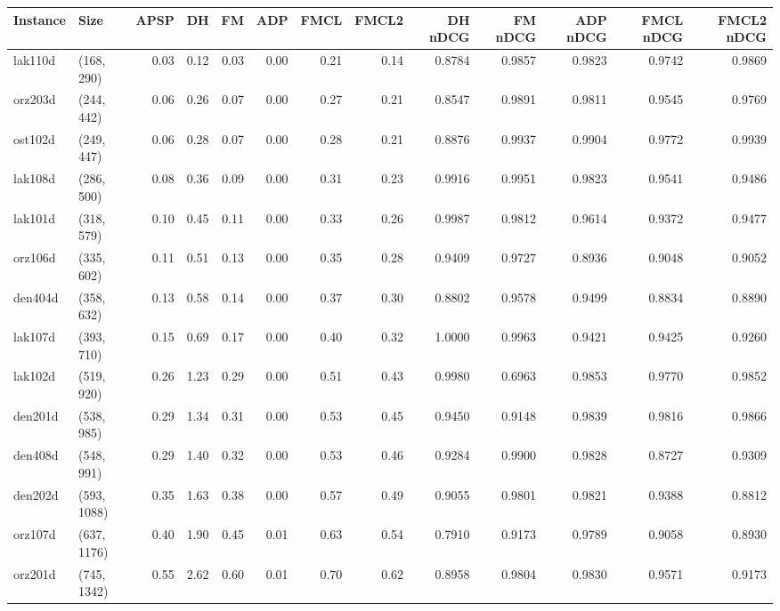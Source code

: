 \begin{tabular}{llrrrrrrrrrrr}
\toprule
Instance &         Size &  APSP &     DH &    FM &  ADP &  FMCL &  FMCL2 &  DH nDCG &  FM nDCG &  ADP nDCG &  FMCL nDCG &  FMCL2 nDCG \\
\midrule
 lak110d &   (168, 290) &  0.03 &   0.12 &  0.03 & 0.00 &  0.21 &   0.14 &   0.8784 &   0.9857 &    0.9823 &     0.9742 &      0.9869 \\
 orz203d &   (244, 442) &  0.06 &   0.26 &  0.07 & 0.00 &  0.27 &   0.21 &   0.8547 &   0.9891 &    0.9811 &     0.9545 &      0.9769 \\
 ost102d &   (249, 447) &  0.06 &   0.28 &  0.07 & 0.00 &  0.28 &   0.21 &   0.8876 &   0.9937 &    0.9904 &     0.9772 &      0.9939 \\
 lak108d &   (286, 500) &  0.08 &   0.36 &  0.09 & 0.00 &  0.31 &   0.23 &   0.9916 &   0.9951 &    0.9823 &     0.9541 &      0.9486 \\
 lak101d &   (318, 579) &  0.10 &   0.45 &  0.11 & 0.00 &  0.33 &   0.26 &   0.9987 &   0.9812 &    0.9614 &     0.9372 &      0.9477 \\
 orz106d &   (335, 602) &  0.11 &   0.51 &  0.13 & 0.00 &  0.35 &   0.28 &   0.9409 &   0.9727 &    0.8936 &     0.9048 &      0.9052 \\
 den404d &   (358, 632) &  0.13 &   0.58 &  0.14 & 0.00 &  0.37 &   0.30 &   0.8802 &   0.9578 &    0.9499 &     0.8834 &      0.8890 \\
 lak107d &   (393, 710) &  0.15 &   0.69 &  0.17 & 0.00 &  0.40 &   0.32 &   1.0000 &   0.9963 &    0.9421 &     0.9425 &      0.9260 \\
 lak102d &   (519, 920) &  0.26 &   1.23 &  0.29 & 0.00 &  0.51 &   0.43 &   0.9980 &   0.6963 &    0.9853 &     0.9770 &      0.9852 \\
 den201d &   (538, 985) &  0.29 &   1.34 &  0.31 & 0.00 &  0.53 &   0.45 &   0.9450 &   0.9148 &    0.9839 &     0.9816 &      0.9866 \\
 den408d &   (548, 991) &  0.29 &   1.40 &  0.32 & 0.00 &  0.53 &   0.46 &   0.9284 &   0.9900 &    0.9828 &     0.8727 &      0.9309 \\
 den202d &  (593, 1088) &  0.35 &   1.63 &  0.38 & 0.00 &  0.57 &   0.49 &   0.9055 &   0.9801 &    0.9821 &     0.9388 &      0.8812 \\
 orz107d &  (637, 1176) &  0.40 &   1.90 &  0.45 & 0.01 &  0.63 &   0.54 &   0.7910 &   0.9173 &    0.9789 &     0.9058 &      0.8930 \\
 orz201d &  (745, 1342) &  0.55 &   2.62 &  0.60 & 0.01 &  0.70 &   0.62 &   0.8958 &   0.9804 &    0.9830 &     0.9571 &      0.9173 \\

\end{tabular}
